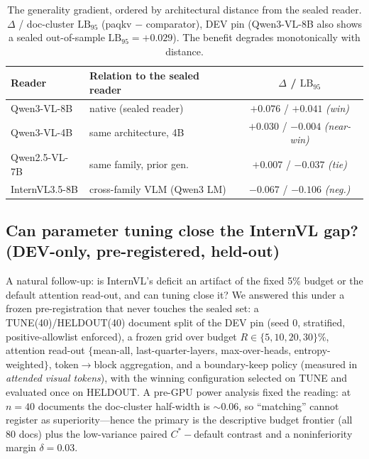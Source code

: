 \documentclass[letterpaper]{article} %
\newcommand{\lb}{\mathrm{LB}_{95}}
\begin{document}
\begin{table}[t]
\centering
\caption{The generality gradient, ordered by architectural distance from the sealed reader.
$\Delta$ / doc-cluster $\lb$ (paqkv $-$ comparator), DEV pin (Qwen3-VL-8B also shows a sealed out-of-sample
$\lb=+0.029$). The benefit degrades monotonically with distance.}
\label{tab:gradient}
\small
\begin{tabular}{@{}llc@{}}
\toprule
Reader & Relation to the sealed reader & $\Delta$ / $\lb$ \\
\midrule
Qwen3-VL-8B    & native (sealed reader)      & $+0.076$ / $+0.041$ \textit{(win)} \\
Qwen3-VL-4B    & same architecture, 4B       & $+0.030$ / $-0.004$ \textit{(near-win)} \\
Qwen2.5-VL-7B  & same family, prior gen.\    & $+0.007$ / $-0.037$ \textit{(tie)} \\
InternVL3.5-8B & cross-family VLM (Qwen3 LM) & $-0.067$ / $-0.106$ \textit{(neg.)} \\
\bottomrule
\end{tabular}
\end{table}

\subsection{Can parameter tuning close the InternVL gap? (DEV-only, pre-registered, held-out)}
\label{sec:tuning}
A natural follow-up: is InternVL's deficit an artifact of the fixed 5\% budget or the default attention read-out,
and can tuning close it? We answered this under a frozen pre-registration that never touches the sealed set: a
TUNE(40)/HELDOUT(40) document split of the DEV pin (seed 0, stratified, positive-allowlist enforced), a frozen grid
over budget $R\in\{5,10,20,30\}\%$, attention read-out $\{$mean-all, last-quarter-layers, max-over-heads,
entropy-weighted$\}$, token$\to$block aggregation, and a boundary-keep policy (measured in \emph{attended visual
tokens}), with the winning configuration selected on TUNE and evaluated once on HELDOUT. A pre-GPU power analysis fixed
the reading: at $n{=}40$ documents the doc-cluster half-width is ${\sim}0.06$, so ``matching'' cannot register as
superiority---hence the primary is the descriptive budget frontier (all 80 docs) plus the low-variance paired
$C^*{-}$default contrast and a noninferiority margin $\delta{=}0.03$.
\end{document}
